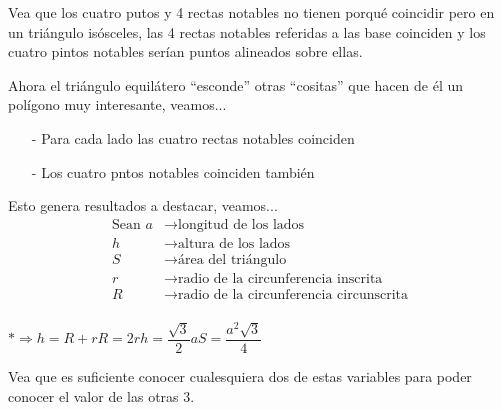 Vea que los cuatro putos y 4 rectas notables no tienen porqué coincidir pero en un triángulo isósceles, las 4 rectas notables referidas a las base coinciden y los cuatro pintos notables serían puntos alineados sobre ellas.

Ahora el triángulo equilátero ``esconde'' otras ``cositas'' que hacen de él un polígono muy interesante, veamos...
\begin{itemize}
    \item[-] Para cada lado las cuatro rectas notables coinciden
    \item[-] Los cuatro pntos notables coinciden también
\end{itemize}

Esto genera resultados a destacar, veamos...
\begin{equation*}
    \begin{aligned}
        \text{Sean } a &\rightarrow \text{longitud de los lados}\\
        h &\rightarrow \text{altura de los lados}\\
        S &\rightarrow \text{área del triángulo}\\
        r &\rightarrow \text{radio de la circunferencia inscrita}\\
        R &\rightarrow \text{radio de la circunferencia circunscrita}\\
    \end{aligned}
\end{equation*}

\hfill$* \Longrightarrow$\hfill$h= R + r$\hfill$R = 2r$\hfill$h=\dfrac{\sqrt{3}}{2}a$\hfill$S = \dfrac{a^2\sqrt{3}}{4}$\hfill

Vea que es suficiente conocer cualesquiera dos de estas variables para poder conocer el valor de las otras 3.

